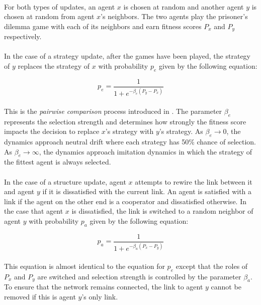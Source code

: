 \documentclass{article}
\begin{document}
	\paragraph{}For both types of updates, an agent $x$ is chosen at random and another agent $y$ is chosen at random from agent $x$'s neighbors.  The two agents play the prisoner's dilemma game with each of its neighbors and earn fitness scores $P_x$ and $P_y$ respectively.
	\paragraph{}In the case of a strategy update, after the games have been played, the strategy of $y$ replaces the strategy of $x$ with probability $p_e$ given by the following equation:

	\begin{equation}
	p_e=\frac{1}{1+e^{-\beta_e(P_y-P_x)}	}	
	\end{equation}

	\paragraph{}This is the \textit{pairwise comparison} process introduced in \cite{Traulsen2006}.  The parameter $\beta_e$ represents the selection strength and determines how strongly the fitness score impacts the decision to replace $x$'s strategy with $y$'s strategy.  As $\beta_e\to0$, the dynamics approach neutral drift where each strategy has 50\% chance of selection.  As $\beta_e\to\infty$, the dynamics approach imitation dynamics in which the strategy of the fittest agent is always selected.
	\paragraph{}In the case of a structure update, agent $x$ attempts to rewire the link between it and agent $y$ if it is dissatisfied with the current link.  An agent is satisfied with a link if the agent on the other end is a cooperator and dissatisfied otherwise.  In the case that agent $x$ is dissatisfied, the link is switched to a random neighbor of agent $y$ with probability $p_a$ given by the following equation:
	
	\begin{equation}
	p_a=\frac{1}{1+e^{-\beta_a(P_x-P_y)}}
	\end{equation}

	\paragraph{}This equation is almost identical to the equation for $p_e$ except that the roles of $P_x$ and $P_y$ are switched and selection strength is controlled by the parameter $\beta_a$.  To ensure that the network remains connected, the link to agent $y$ cannot be removed if this is agent $y$'s only link.
\end{document}
